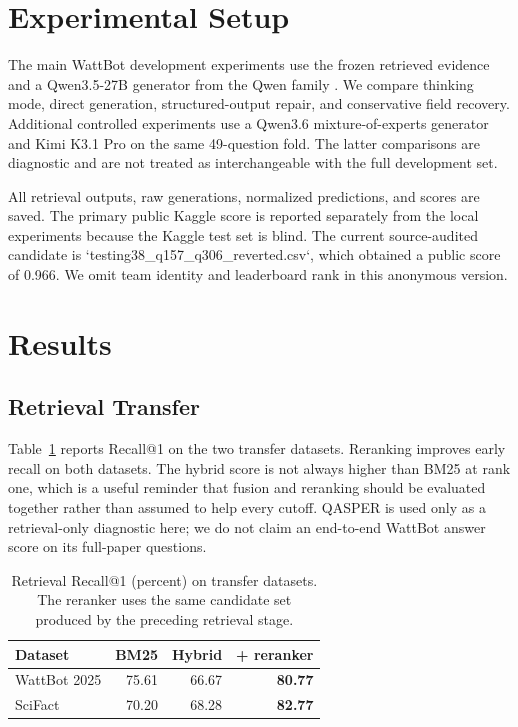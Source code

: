 \documentclass[11pt]{article}
\begin{document}
\section{Experimental Setup}
\label{sec:setup}
The main WattBot development experiments use the frozen retrieved evidence and a Qwen3.5-27B generator from the Qwen family \citep{qwen3,qwen3embedding}. We compare thinking mode, direct generation, structured-output repair, and conservative field recovery. Additional controlled experiments use a Qwen3.6 mixture-of-experts generator and Kimi K3.1 Pro \citep{kimiwa} on the same 49-question fold. The latter comparisons are diagnostic and are not treated as interchangeable with the full development set.

All retrieval outputs, raw generations, normalized predictions, and scores are saved. The primary public Kaggle score is reported separately from the local experiments because the Kaggle test set is blind. The current source-audited candidate is `testing38\_q157\_q306\_reverted.csv`, which obtained a public score of 0.966. We omit team identity and leaderboard rank in this anonymous version.

\section{Results}
\label{sec:results}
\subsection{Retrieval Transfer}
Table~\ref{tab:retrieval} reports Recall@1 on the two transfer datasets. Reranking improves early recall on both datasets. The hybrid score is not always higher than BM25 at rank one, which is a useful reminder that fusion and reranking should be evaluated together rather than assumed to help every cutoff. QASPER is used only as a retrieval-only diagnostic here; we do not claim an end-to-end WattBot answer score on its full-paper questions.

\begin{table}[t]
\centering
\scriptsize
\begin{tabular}{lrrr}
\toprule
Dataset & BM25 & Hybrid & + reranker \\
\midrule
WattBot 2025 & 75.61 & 66.67 & \textbf{80.77} \\
SciFact & 70.20 & 68.28 & \textbf{82.77} \\
\bottomrule
\end{tabular}
\caption{Retrieval Recall@1 (percent) on transfer datasets. The reranker uses the same candidate set produced by the preceding retrieval stage.}
\label{tab:retrieval}
\end{table}
\end{document}
